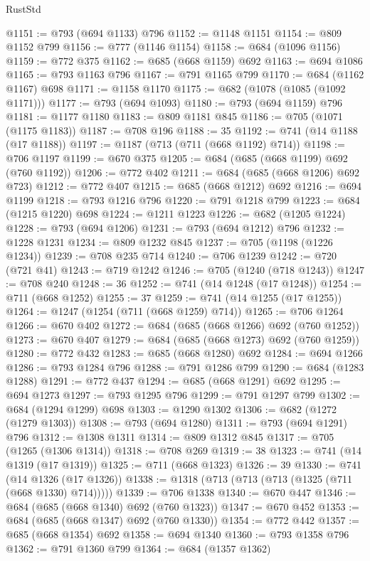 \begin{lexlean}{RustStd}
\begin{coremodule}
@1151 := @793 (@694 @1133) @796
@1152 := @1148 @1151
@1154 := @809 @1152 @799
@1156 := @777 (@1146 @1154)
@1158 := @684 (@1096 @1156)
@1159 := @772 @375
@1162 := @685 (@668 @1159) @692
@1163 := @694 @1086
@1165 := @793 @1163 @796
@1167 := @791 @1165 @799
@1170 := @684 (@1162 @1167) @698
@1171 := @1158 @1170
@1175 := @682 (@1078 (@1085 (@1092 @1171)))
@1177 := @793 (@694 @1093)
@1180 := @793 (@694 @1159) @796
@1181 := @1177 @1180
@1183 := @809 @1181 @845
@1186 := @705 (@1071 (@1175 @1183))
@1187 := @708 @196
@1188 := 35
@1192 := @741 (@14 @1188 (@17 @1188))
@1197 := @1187 (@713 (@711 (@668 @1192) @714))
@1198 := @706 @1197
@1199 := @670 @375
@1205 := @684 (@685 (@668 @1199) @692 (@760 @1192))
@1206 := @772 @402
@1211 := @684 (@685 (@668 @1206) @692 @723)
@1212 := @772 @407
@1215 := @685 (@668 @1212) @692
@1216 := @694 @1199
@1218 := @793 @1216 @796
@1220 := @791 @1218 @799
@1223 := @684 (@1215 @1220) @698
@1224 := @1211 @1223
@1226 := @682 (@1205 @1224)
@1228 := @793 (@694 @1206)
@1231 := @793 (@694 @1212) @796
@1232 := @1228 @1231
@1234 := @809 @1232 @845
@1237 := @705 (@1198 (@1226 @1234))
@1239 := @708 @235 @714
@1240 := @706 @1239
@1242 := @720 (@721 @41)
@1243 := @719 @1242
@1246 := @705 (@1240 (@718 @1243))
@1247 := @708 @240
@1248 := 36
@1252 := @741 (@14 @1248 (@17 @1248))
@1254 := @711 (@668 @1252)
@1255 := 37
@1259 := @741 (@14 @1255 (@17 @1255))
@1264 := @1247 (@1254 (@711 (@668 @1259) @714))
@1265 := @706 @1264
@1266 := @670 @402
@1272 := @684 (@685 (@668 @1266) @692 (@760 @1252))
@1273 := @670 @407
@1279 := @684 (@685 (@668 @1273) @692 (@760 @1259))
@1280 := @772 @432
@1283 := @685 (@668 @1280) @692
@1284 := @694 @1266
@1286 := @793 @1284 @796
@1288 := @791 @1286 @799
@1290 := @684 (@1283 @1288)
@1291 := @772 @437
@1294 := @685 (@668 @1291) @692
@1295 := @694 @1273
@1297 := @793 @1295 @796
@1299 := @791 @1297 @799
@1302 := @684 (@1294 @1299) @698
@1303 := @1290 @1302
@1306 := @682 (@1272 (@1279 @1303))
@1308 := @793 (@694 @1280)
@1311 := @793 (@694 @1291) @796
@1312 := @1308 @1311
@1314 := @809 @1312 @845
@1317 := @705 (@1265 (@1306 @1314))
@1318 := @708 @269
@1319 := 38
@1323 := @741 (@14 @1319 (@17 @1319))
@1325 := @711 (@668 @1323)
@1326 := 39
@1330 := @741 (@14 @1326 (@17 @1326))
@1338 := @1318 (@713 (@713 (@713 (@1325 (@711 (@668 @1330) @714)))))
@1339 := @706 @1338
@1340 := @670 @447
@1346 := @684 (@685 (@668 @1340) @692 (@760 @1323))
@1347 := @670 @452
@1353 := @684 (@685 (@668 @1347) @692 (@760 @1330))
@1354 := @772 @442
@1357 := @685 (@668 @1354) @692
@1358 := @694 @1340
@1360 := @793 @1358 @796
@1362 := @791 @1360 @799
@1364 := @684 (@1357 @1362)

\end{coremodule}
\end{lexlean}
